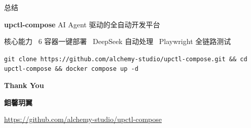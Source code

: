 \documentclass[10pt,aspectratio=169,utf8]{beamer}
\begin{document}
\begin{frame}{总结}
  \begin{center}
    \vspace{0.8cm}
    {\Large\bfseries upctl-compose}
    \vspace{0.2cm}
    {\normalsize AI Agent 驱动的全自动开发平台}

    \vspace{0.3cm}
    \begin{block}{核心能力}
      \centering
      \faDocker\ 6 容器一键部署 \qquad
      \faRobot\ DeepSeek 自动处理 \qquad
      \faCheckCircle\ Playwright 全链路测试
    \end{block}

    \vspace{0.3cm}
    \texttt{git clone https://github.com/alchemy-studio/upctl-compose.git \&\& cd upctl-compose \&\& docker compose up -d}
  \end{center}
\end{frame}

\begin{frame}[plain]
  \begin{center}
    \vspace{3cm}
    {\Huge \textcolor{myblue}{\textbf{Thank You}}}

    \vspace{2cm}
    {\Large \textbf{鉬馨玥翼}}

    \vspace{0.8cm}
    {\Large \url{https://github.com/alchemy-studio/upctl-compose}}
  \end{center}
\end{frame}
\end{document}
